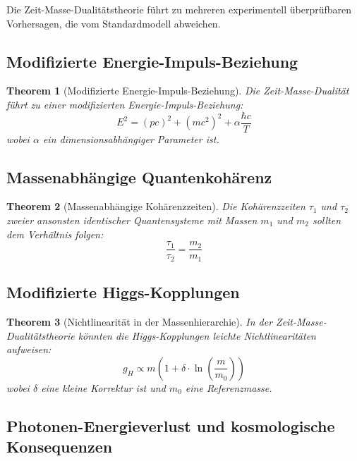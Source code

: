 \documentclass[a4paper,12pt]{article}
\newtheorem{theorem}{Theorem}[section]
\begin{document}
Die Zeit-Masse-Dualitätstheorie führt zu mehreren experimentell überprüfbaren Vorhersagen, die vom Standardmodell abweichen.

\subsection{Modifizierte Energie-Impuls-Beziehung}

\begin{theorem}[Modifizierte Energie-Impuls-Beziehung]
	Die Zeit-Masse-Dualität führt zu einer modifizierten Energie-Impuls-Beziehung:
	\begin{equation}
		E^2 = (p c)^2 + (m c^2)^2 + \alpha \frac{\hbar c}{T}
	\end{equation}
	wobei \( \alpha \) ein dimensionsabhängiger Parameter ist.
\end{theorem}

\subsection{Massenabhängige Quantenkohärenz}

\begin{theorem}[Massenabhängige Kohärenzzeiten]
	Die Kohärenzzeiten \( \tau_1 \) und \( \tau_2 \) zweier ansonsten identischer Quantensysteme mit Massen \( m_1 \) und \( m_2 \) sollten dem Verhältnis folgen:
	\begin{equation}
		\frac{\tau_1}{\tau_2} = \frac{m_2}{m_1}
	\end{equation}
\end{theorem}

\subsection{Modifizierte Higgs-Kopplungen}

\begin{theorem}[Nichtlinearität in der Massenhierarchie]
	In der Zeit-Masse-Dualitätstheorie könnten die Higgs-Kopplungen leichte Nichtlinearitäten aufweisen:
	\begin{equation}
		g_H \propto m \left(1 + \delta \cdot \ln\left(\frac{m}{m_0}\right)\right)
	\end{equation}
	wobei \( \delta \) eine kleine Korrektur ist und \( m_0 \) eine Referenzmasse.
\end{theorem}

\subsection{Photonen-Energieverlust und kosmologische Konsequenzen}
\end{document}
